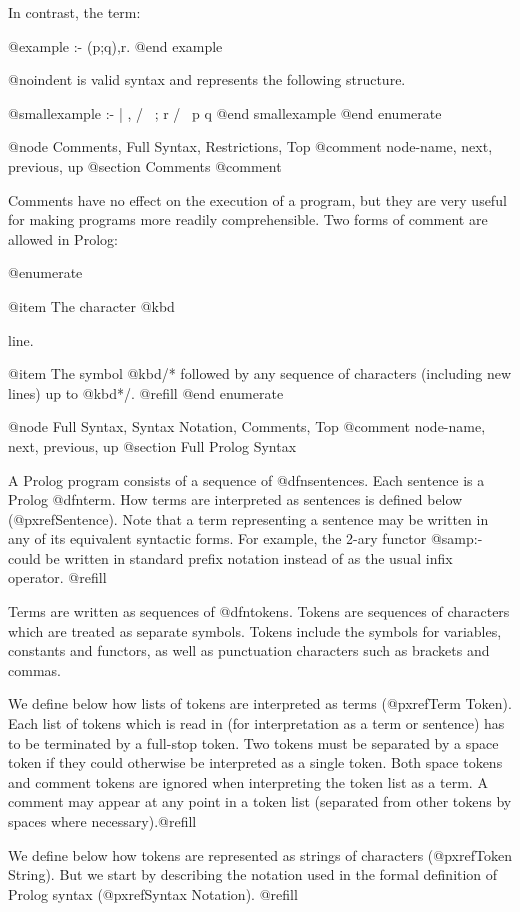 {In contrast, the term:

@example
:- (p;q),r.
@end example

@noindent
is valid syntax and represents the following structure.  

@smallexample
   :-
    |
    ,
   / \
  ;   r
 / \
p   q
@end smallexample
@end enumerate

@node Comments, Full Syntax, Restrictions, Top
@comment  node-name,  next,  previous,  up
@section Comments
@comment

Comments have no effect on the execution of a program, but they are very
useful for making programs more readily comprehensible.  Two forms of
comment are allowed in Prolog:

@enumerate

@item
The character @kbd{%
line.

@item
The symbol @kbd{/*} followed by any sequence of characters (including new
lines) up to @kbd{*/}. @refill
@end enumerate

@node Full Syntax, Syntax Notation, Comments, Top
@comment  node-name,  next,  previous,  up
@section Full Prolog Syntax

A Prolog program consists of a sequence of @dfn{sentences}.  Each sentence
is a Prolog @dfn{term}.  How terms are interpreted as sentences is defined
below (@pxref{Sentence}).  Note that a term representing a sentence may be
written in any of its equivalent syntactic forms.  For example, the 2-ary
functor @samp{:-} could be written in standard prefix notation instead of
as the usual infix operator. @refill

Terms are written as sequences of @dfn{tokens}.  Tokens are sequences of
characters which are treated as separate symbols.  Tokens include the
symbols for variables, constants and functors, as well as punctuation
characters such as brackets and commas.

We define below how lists of tokens are interpreted as terms (@pxref{Term
Token}).  Each list of tokens which is read in (for interpretation as a
term or sentence) has to be terminated by a full-stop token.  Two tokens
must be separated by a space token if they could otherwise be interpreted
as a single token.  Both space tokens and comment tokens are ignored when
interpreting the token list as a term.  A comment may appear at any point
in a token list (separated from other tokens by spaces where necessary).@refill

We define below how tokens are represented as strings of characters
(@pxref{Token String}).  But we start by describing the notation used in
the formal definition of Prolog syntax (@pxref{Syntax Notation}).
@refill

}}
